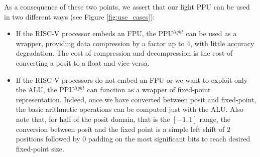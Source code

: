 As a consequence of these two points, we assert that our light PPU can be used in two different ways (see Figure \ref{fig:use_cases}):
\begin{itemize}
    \item If the RISC-V processor embeds an FPU, the PPU$^{light}$ can be used as a wrapper, providing data compression by a factor up to 4, with little accuracy degradation. The cost of compression and decompression is the cost of converting a posit to a float and vice-versa.
    \item If the RISC-V processors do not embed an FPU or we want to exploit only the ALU, the PPU$^{light}$ can function as a wrapper of fixed-point representation. Indeed, once we have converted between posit and fixed-point, the basic arithmetic operations can be computed just with the ALU. Also note that, for half of the posit domain, that is the $[-1,1]$ range, the conversion between posit and the fixed point is a simple left shift of $2$ positions followed by $0$ padding on the most significant bits to reach desired fixed-point size.
\end{itemize}

